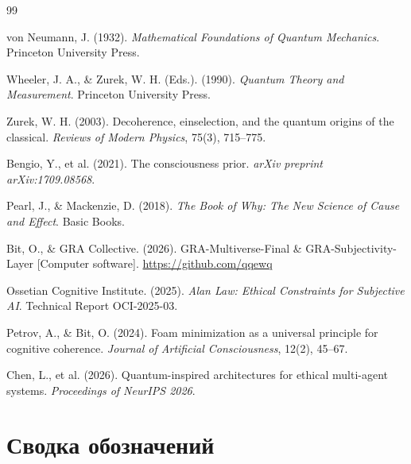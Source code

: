 \documentclass[11pt,a4paper]{article}
\theoremstyle{plain}
\theoremstyle{definition}
\theoremstyle{remark}
\begin{document}

\begin{thebibliography}{99}

von Neumann, J. (1932).
\newblock \textit{Mathematical Foundations of Quantum Mechanics}.
\newblock Princeton University Press.

Wheeler, J. A., \& Zurek, W. H. (Eds.). (1990).
\newblock \textit{Quantum Theory and Measurement}.
\newblock Princeton University Press.

Zurek, W. H. (2003).
\newblock Decoherence, einselection, and the quantum origins of the classical.
\newblock \textit{Reviews of Modern Physics}, 75(3), 715--775.

Bengio, Y., et al. (2021).
\newblock The consciousness prior.
\newblock \textit{arXiv preprint arXiv:1709.08568}.

Pearl, J., \& Mackenzie, D. (2018).
\newblock \textit{The Book of Why: The New Science of Cause and Effect}.
\newblock Basic Books.

Bit, O., \& GRA Collective. (2026).
\newblock GRA-Multiverse-Final \& GRA-Subjectivity-Layer [Computer software].
\newblock \url{https://github.com/qqewq}

Ossetian Cognitive Institute. (2025).
\newblock \textit{Alan Law: Ethical Constraints for Subjective AI}.
\newblock Technical Report OCI-2025-03.

Petrov, A., \& Bit, O. (2024).
\newblock Foam minimization as a universal principle for cognitive coherence.
\newblock \textit{Journal of Artificial Consciousness}, 12(2), 45--67.

Chen, L., et al. (2026).
\newblock Quantum-inspired architectures for ethical multi-agent systems.
\newblock \textit{Proceedings of NeurIPS 2026}.

\end{thebibliography}

\appendix
\section{Сводка обозначений}
\label{app:notation}
\end{document}
